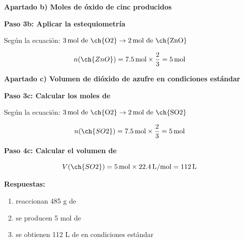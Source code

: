 \begin{exercise}
\begin{solu}
        \textbf{Apartado b) Moles de óxido de cinc producidos}

        \textbf{Paso 3b: Aplicar la estequiometría}

        Según la ecuación: $3\,\text{mol de \ch{O2}} \rightarrow 2\,\text{mol de \ch{ZnO}}$

        \begin{equation*}
            n(\ch{ZnO}) = 7.5\,\text{mol} \times \frac{2}{3} = 5\,\text{mol}
        \end{equation*}

        \textbf{Apartado c) Volumen de dióxido de azufre en condiciones estándar}

        \textbf{Paso 3c: Calcular los moles de }

        Según la ecuación: $3\,\text{mol de \ch{O2}} \rightarrow 2\,\text{mol de \ch{SO2}}$

        \begin{equation*}
            n(\ch{SO2}) = 7.5\,\text{mol} \times \frac{2}{3} = 5\,\text{mol}
        \end{equation*}

        \textbf{Paso 4c: Calcular el volumen de }

        \begin{equation*}
            V(\ch{SO2}) = 5\,\text{mol} \times 22.4\,\text{L/mol} = 112\,\text{L}
        \end{equation*}

        \textbf{Respuestas:}
        \begin{enumerate}[label=\letraminuscula]
            \item reaccionan 485 g de 
            \item se producen 5 mol de 
            \item se obtienen 112 L de  en condiciones estándar
        \end{enumerate}
    \end{solu}
\end{exercise}

